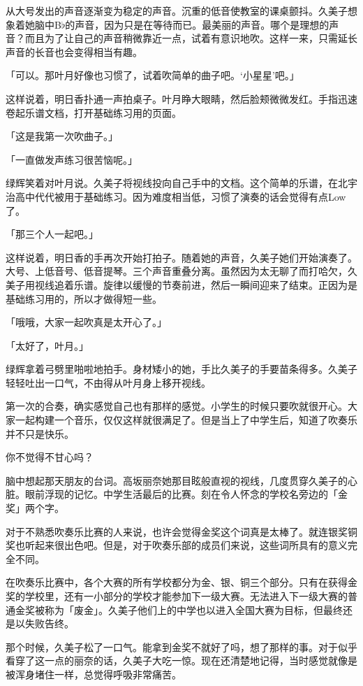 \documentclass[UTF8]{ctexart}
\begin{document}
    从大号发出的声音逐渐变为稳定的声音。沉重的低音使教室的课桌颤抖。久美子想象着她脑中B$\flat$的声音，因为只是在等待而已。最美丽的声音。哪个是理想的声音？而且为了让自己的声音稍微靠近一点，试着有意识地吹。这样一来，只需延长声音的长音也会变得相当有趣。

    「可以。那叶月好像也习惯了，试着吹简单的曲子吧。‘小星星’吧。」

    这样说着，明日香扑通一声拍桌子。叶月睁大眼睛，然后脸颊微微发红。手指迅速卷起乐谱文档，打开基础练习用的页面。

    「这是我第一次吹曲子。」

    「一直做发声练习很苦恼呢。」

    绿辉笑着对叶月说。久美子将视线投向自己手中的文档。这个简单的乐谱，在北宇治高中代代被用于基础练习。因为难度相当低，习惯了演奏的话会觉得有点Low了。

    「那三个人一起吧。」

    这样说着，明日香的手再次开始打拍子。随着她的声音，久美子她们开始演奏了。大号、上低音号、低音提琴。三个声音重叠分离。虽然因为太无聊了而打哈欠，久美子用视线追着乐谱。旋律以缓慢的节奏前进，然后一瞬间迎来了结束。正因为是基础练习用的，所以才做得短一些。

    「哦哦，大家一起吹真是太开心了。」

    「太好了，叶月。」

    绿辉拿着弓劈里啪啦地拍手。身材矮小的她，手比久美子的手要苗条得多。久美子轻轻吐出一口气，不由得从叶月身上移开视线。

    第一次的合奏，确实感觉自己也有那样的感觉。小学生的时候只要吹就很开心。大家一起构建一个音乐，仅仅这样就很满足了。但是当上了中学生后，知道了吹奏乐并不只是快乐。

    你不觉得不甘心吗？

    脑中想起那天朋友的台词。高坂丽奈她那目眩般直视的视线，几度贯穿久美子的心脏。眼前浮现的记忆。中学生活最后的比赛。刻在令人怀念的学校名旁边的「金奖」两个字。

    对于不熟悉吹奏乐比赛的人来说，也许会觉得金奖这个词真是太棒了。就连银奖铜奖也听起来很出色吧。但是，对于吹奏乐部的成员们来说，这些词所具有的意义完全不同。

    在吹奏乐比赛中，各个大赛的所有学校都分为金、银、铜三个部分。只有在获得金奖的学校里，还有一小部分的学校才能参加下一级大赛。无法进入下一级大赛的普通金奖被称为「废金」。久美子他们上的中学也以进入全国大赛为目标，但最终还是以失败告终。

    那个时候，久美子松了一口气。能拿到金奖不就好了吗，想了那样的事。对于似乎看穿了这一点的丽奈的话，久美子大吃一惊。现在还清楚地记得，当时感觉就像是被浑身堵住一样，总觉得呼吸非常痛苦。
\end{document}
